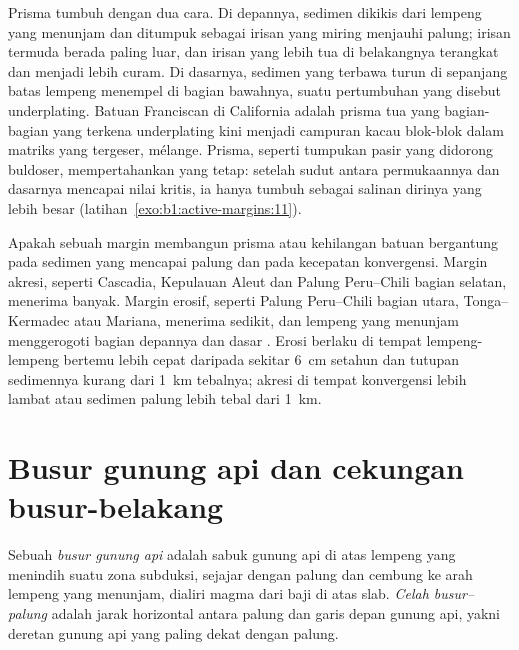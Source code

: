 Prisma tumbuh dengan dua cara. Di depannya, sedimen dikikis dari lempeng yang menunjam dan ditumpuk sebagai irisan yang miring menjauhi palung; irisan termuda berada paling luar, dan irisan yang lebih tua di belakangnya terangkat dan menjadi lebih curam. Di dasarnya, sedimen yang terbawa turun di sepanjang batas lempeng menempel di bagian bawahnya, suatu pertumbuhan yang disebut underplating. Batuan Franciscan di California adalah prisma tua yang bagian-bagian yang terkena underplating kini menjadi campuran kacau blok-blok dalam matriks yang tergeser, mélange. Prisma, seperti tumpukan pasir yang didorong buldoser, mempertahankan  yang tetap: setelah sudut antara permukaannya dan dasarnya mencapai nilai kritis, ia hanya tumbuh sebagai salinan dirinya yang lebih besar (latihan~\ref{exo:b1:active-margins:11}).

Apakah sebuah margin membangun prisma atau kehilangan batuan bergantung pada sedimen yang mencapai palung dan pada kecepatan konvergensi. Margin akresi, seperti Cascadia, Kepulauan Aleut dan Palung Peru--Chili bagian selatan, menerima banyak. Margin erosif, seperti Palung Peru--Chili bagian utara, Tonga--Kermadec atau Mariana, menerima sedikit, dan lempeng yang menunjam menggerogoti bagian depannya dan dasar . Erosi berlaku di tempat lempeng-lempeng bertemu lebih cepat daripada sekitar \qty{6}{cm} setahun dan tutupan sedimennya kurang dari \qty{1}{km} tebalnya; akresi di tempat konvergensi lebih lambat atau sedimen palung lebih tebal dari \qty{1}{km}.

\section{Busur gunung api dan cekungan busur-belakang}\label{sec:b1:active-margins:arcs}

\begin{definition}\label{def:b1:active-margins:volcanic-arc}
Sebuah \emph{busur gunung api} adalah sabuk gunung api di atas lempeng yang menindih suatu zona subduksi, sejajar dengan palung dan cembung ke arah lempeng yang menunjam, dialiri magma dari baji  di atas slab. \emph{Celah busur--palung} adalah jarak horizontal antara palung dan garis depan gunung api, yakni deretan gunung api yang paling dekat dengan palung.
\end{definition}

